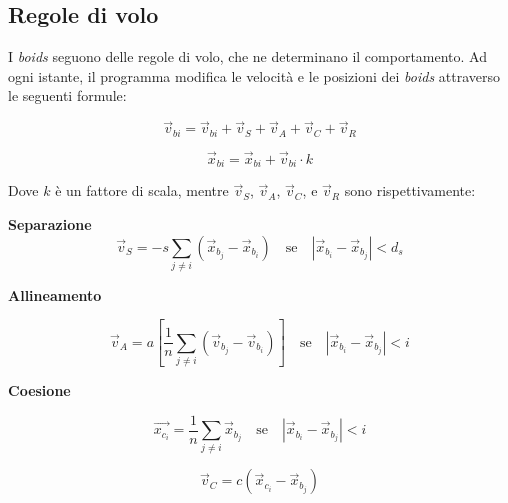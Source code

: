 \documentclass[10pt,a4paper]{article}
\begin{document}
\subsection{Regole di volo}

I \textit{boids} seguono delle regole di volo, che ne determinano il comportamento. Ad ogni istante, il programma modifica le velocità e le posizioni dei \textit{boids} attraverso le seguenti formule:

\begin{equation*}
    \vec{v}_{bi} = \vec{v}_{bi} + \vec{v}_S + \vec{v}_A + \vec{v}_C + \vec{v}_R
\end{equation*}

\begin{equation*}
    \vec{x}_{bi} = \vec{x}_{bi} + \vec{v}_{bi} \cdot k
\end{equation*}

Dove $k$ è un fattore di scala, mentre $\vec{v}_S$, $\vec{v}_A$, $\vec{v}_C$, e $\vec{v}_R$ sono rispettivamente:

\vspace{2mm}

\textbf{Separazione}
\begin{equation*}
    \vec{v}_S = -s \sum_{j \neq i} (\vec{x}_{b_j} - \vec{x}_{b_i}) \quad \text{se} \quad \left| \vec{x}_{b_i} - \vec{x}_{b_j} \right| < d_s
\end{equation*}

\vspace{2mm}

\textbf{Allineamento}

\begin{equation*}
    \vec{v}_A = a \left[ \frac{1}{n} \sum_{j \neq i} (\vec{v}_{b_j} - \vec{v}_{b_i}) \right] \quad \text{se} \quad \left| \vec{x}_{b_i} - \vec{x}_{b_j} \right| < i
\end{equation*}

\vspace{2mm}

\textbf{Coesione}

\begin{equation*}
    \vec{x_{c_i}} = \frac{1}{n} \sum_{j \neq i} \vec{x}_{b_j} \quad \text{se} \quad \left| \vec{x}_{b_i} - \vec{x}_{b_j} \right| < i
\end{equation*}

\vspace{2mm}

\begin{equation*}
    \vec{v}_C = c (\vec{x}_{c_i} - \vec{x}_{b_j})
\end{equation*}
\end{document}
